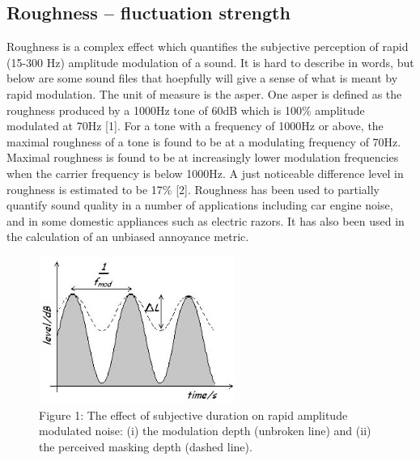 %
%

%
\subsection*{Roughness -- fluctuation
strength}\label{roughness-fluctuation-strength}

Roughness is a complex effect which quantifies the subjective perception
of rapid (15-300 Hz) amplitude modulation of a sound. It is hard to
describe in words, but below are some sound files that hoepfully will
give a sense of what is meant by rapid modulation. The unit of measure
is the asper. One asper is defined as the roughness produced by a 1000Hz
tone of 60dB which is 100\% amplitude modulated at 70Hz {[}1{]}. For a
tone with a frequency of 1000Hz or above, the maximal roughness of a
tone is found to be at a modulating frequency of 70Hz. Maximal roughness
is found to be at increasingly lower modulation frequencies when the
carrier frequency is below 1000Hz. A just noticeable difference level in
roughness is estimated to be 17\% {[}2{]}. Roughness has been used to
partially quantify sound quality in a number of applications including
car engine noise, and in some domestic appliances such as electric
razors. It has also been used in the calculation of an unbiased
annoyance metric.

\begin{figure}[h]
\centering
\includegraphics[width=2.525in]{img/model-of-roughness-masking_002.jpg}
\caption*{Figure 1: The effect of subjective duration on rapid amplitude
modulated noise: (i) the modulation depth (unbroken line) and (ii) the
perceived masking depth (dashed line).}
\end{figure}

